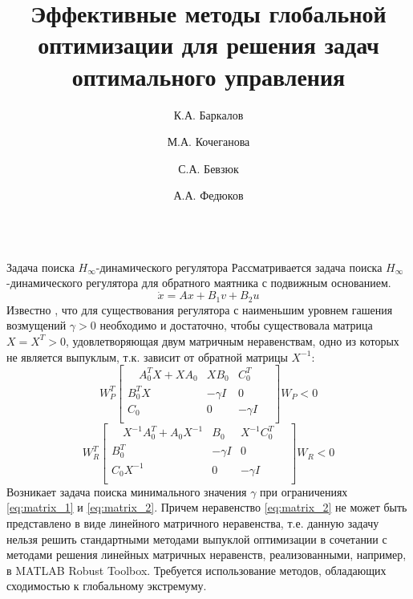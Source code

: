 \documentclass{beamer}
\title{Эффективные методы глобальной оптимизации
для решения задач оптимального управления
}
\author{К.А. Баркалов \and М.А. Кочеганова \and С.А. Бевзюк \and А.А. Федюков}
\institute{ННГУ им. Н.И. Лобачевского}
\begin{document}
\begin{frame}[t]
    \begin{columns}[t]
        \begin{column}[t]{0.48\paperwidth}
            \begin{block}{Задача поиска $H_{\infty}$-динамического регулятора}
              Рассматривается задача поиска $H_{\infty}$ -динамического регулятора для обратного маятника с подвижным основанием.
							\begin{equation}\label{eq:system}
                \dot{x}=A x + B_1 v + B_2 u
              \end{equation}
							Известно \cite{synthesisControlBook}, что для существования регулятора с наименьшим уровнем гашения возмущений $\gamma>0$ необходимо и достаточно, чтобы существовала матрица $X=X^T>0$, удовлетворяющая  двум матричным неравенствам, одно из которых не является выпуклым, т.к. зависит от обратной матрицы $X^{-1}$:
							\begin{equation}\label{eq:matrix_1}
                W_{P}^T 
								\begin{bmatrix}
                  \quad A_{0}^T X + X A_0 & X B_0 & C_{0}^T \\
                  B_{0}^T X & -\gamma I & 0 \\
									C_0  & 0 & -\gamma I \quad \\
                \end{bmatrix}
								W_P
                < 0
              \end{equation}
							\begin{equation}\label{eq:matrix_2}
                W_{R}^T 
								\begin{bmatrix}
                  \quad X^{-1} A_{0}^T + A_0 X^{-1} & B_0 & X^{-1} C_{0}^T \quad  \\
                  B_{0}^T & -\gamma I & 0 \\
									C_0 X^{-1} & 0 & -\gamma I\\
                \end{bmatrix}
								W_R
                < 0
              \end{equation}
							Возникает задача поиска минимального значения $\gamma$  при ограничениях \eqref{eq:matrix_1} и \eqref{eq:matrix_2}.
Причем неравенство \eqref{eq:matrix_2} не может быть представлено в виде линейного матричного неравенства, т.е. данную задачу нельзя решить стандартными методами выпуклой оптимизации в сочетании
с методами решения линейных матричных неравенств, реализованными,
например, в MATLAB Robust Toolbox. Требуется использование
методов, обладающих сходимостью к глобальному экстремуму.
						

\end{block}
\end{column}
\end{columns}
\end{frame}
\end{document}
